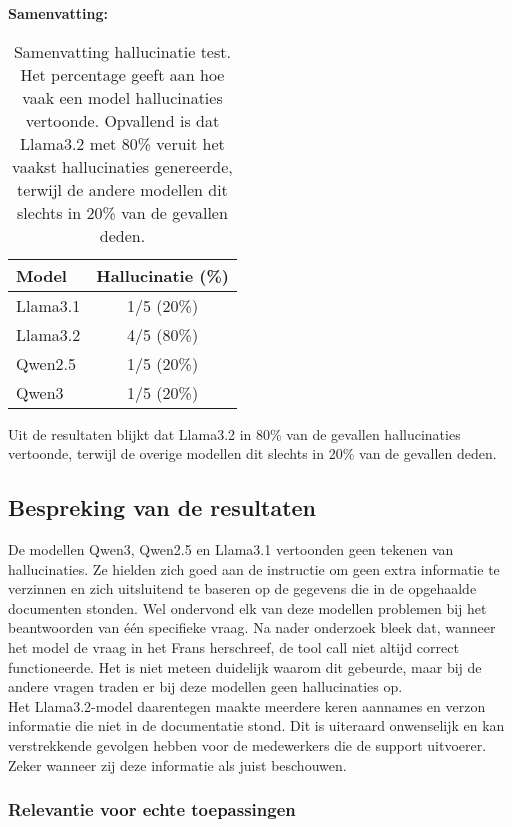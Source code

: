 \noindent\textbf{Samenvatting:}  
\begin{table}[H]
    \begin{tabular}{|l|c|}
        \hline
        \textbf{Model} & \textbf{Hallucinatie (\%)} \\
        \hline
        Llama3.1 & 1/5 (20\%) \\
        Llama3.2 & 4/5 (80\%) \\
        Qwen2.5  & 1/5 (20\%) \\
        Qwen3    & 1/5 (20\%) \\
        \hline
    \end{tabular}
    \caption{Samenvatting hallucinatie test. Het percentage geeft aan hoe vaak een model hallucinaties vertoonde. Opvallend is dat Llama3.2 met 80\% veruit het vaakst hallucinaties genereerde, terwijl de andere modellen dit slechts in 20\% van de gevallen deden.}
\end{table}

Uit de resultaten blijkt dat Llama3.2 in 80\% van de gevallen hallucinaties vertoonde, terwijl de overige modellen dit slechts in 20\% van de gevallen deden.

\subsection{Bespreking van de resultaten}

De modellen Qwen3, Qwen2.5 en Llama3.1 vertoonden geen tekenen van hallucinaties. Ze hielden zich goed aan de instructie om geen extra informatie te verzinnen en zich uitsluitend te baseren op de gegevens die in de opgehaalde documenten stonden. Wel ondervond elk van deze modellen problemen bij het beantwoorden van één specifieke vraag. Na nader onderzoek bleek dat, wanneer het model de vraag in het Frans herschreef, de tool call niet altijd correct functioneerde. Het is niet meteen duidelijk waarom dit gebeurde, maar bij de andere vragen traden er bij deze modellen geen hallucinaties op.
\\[1em]
Het Llama3.2-model daarentegen maakte meerdere keren aannames en verzon informatie die niet in de documentatie stond. Dit is uiteraard onwenselijk en kan verstrekkende gevolgen hebben voor de medewerkers die de support uitvoerer. Zeker wanneer zij deze informatie als juist beschouwen.

\subsubsection{Relevantie voor echte toepassingen}

